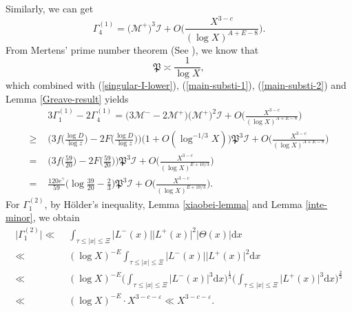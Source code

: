 \documentclass[a4paper,oneside,11pt]{article}%
\numberwithin{equation}{section}
\begin{document}
Similarly, we can get
\begin{equation}\label{main-substi-2}
\Gamma_4^{(1)}=\big(\mathcal{M}^+\big)^3\mathcal{I}+O\bigg(\frac{X^{3-c}}{(\log X)^{A+E-8}}\bigg).
\end{equation}
From Mertens' prime number theorem (See \cite{Mertens-1874}), we know that
\begin{equation*}
   \mathfrak{P}\asymp\frac{1}{\log X},
\end{equation*}
which combined with (\ref{singular-I-lower}), (\ref{main-substi-1}), (\ref{main-substi-2}) and Lemma \ref{Greave-result} yields
\begin{align}\label{main-term-lower}
      & \,\,   3\Gamma_1^{(1)}-2\Gamma_4^{(1)}
= \big(3\mathcal{M}^--2\mathcal{M}^+\big)\big(\mathcal{M}^+\big)^2\mathcal{I}
          +O\bigg(\frac{X^{3-c}}{(\log X)^{A+E-8}}\bigg)
                       \nonumber \\
\geqslant & \,\,\bigg(3f\bigg(\frac{\log D}{\log z}\bigg)-2F\bigg(\frac{\log D}{\log z}\bigg)\bigg)\big(1+O(\log^{-1/3}X)\big)
                \mathfrak{P}^3\mathcal{I}+O\bigg(\frac{X^{3-c}}{(\log X)^{A+E-8}}\bigg)
                       \nonumber \\
= & \,\, \bigg(3f\bigg(\frac{59}{20}\bigg)-2F\bigg(\frac{59}{20}\bigg)\bigg)\mathfrak{P}^3\mathcal{I}
         +O\bigg(\frac{X^{3-c}}{(\log X)^{E+10/3}}\bigg)
                        \nonumber \\
= & \,\, \frac{120e^\gamma}{59}\bigg(\log\frac{39}{20}-\frac{2}{3}\bigg)\mathfrak{P}^3\mathcal{I}
         +O\bigg(\frac{X^{3-c}}{(\log X)^{E+10/3}}\bigg).
\end{align}
For $\Gamma_1^{(2)}$, by H\"{o}lder's inequality, Lemma \ref{xiaobei-lemma} and Lemma \ref{inte-minor}, we obtain
\begin{align}\label{Gamma_1-(2)-upper}
           \big|\Gamma_1^{(2)}\big|
\ll & \,\, \int_{\tau\leqslant|x|\leqslant\Xi}\big|L^-(x)\big|\big|L^+(x)\big|^2\big|\Theta(x)\big|\mathrm{d}x
                     \nonumber \\
\ll & \,\, (\log X)^{-E}\int_{\tau\leqslant|x|\leqslant\Xi}\big|L^-(x)\big|\big|L^+(x)\big|^2\mathrm{d}x
                     \nonumber \\
\ll & \,\, (\log X)^{-E}\bigg(\int_{\tau\leqslant|x|\leqslant\Xi}\big|L^-(x)\big|^3\mathrm{d}x\bigg)^{\frac{1}{3}}
           \bigg(\int_{\tau\leqslant|x|\leqslant\Xi}\big|L^+(x)\big|^3\mathrm{d}x\bigg)^{\frac{2}{3}}
                     \nonumber \\
\ll & \,\, (\log X)^{-E}\cdot X^{3-c-\varepsilon}\ll X^{3-c-\varepsilon}.
\end{align}
\end{document}
